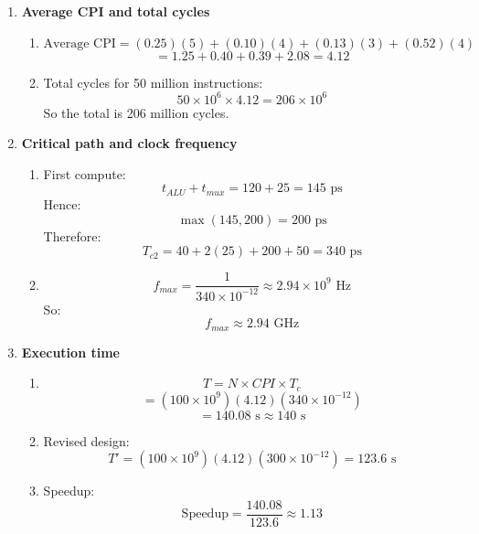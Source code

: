 \documentclass[11pt]{article}
\begin{document}
\begin{enumerate}[label=\textbf{B\arabic*.}]
  \item \textbf{Average CPI and total cycles}
  \begin{enumerate}[label=(\alph*)]
    \item
    \[
      \text{Average CPI} = (0.25)(5) + (0.10)(4) + (0.13)(3) + (0.52)(4)
    \]
    \[
      = 1.25 + 0.40 + 0.39 + 2.08 = 4.12
    \]
    \item Total cycles for 50 million instructions:
    \[
      50 \times 10^6 \times 4.12 = 206 \times 10^6
    \]
    So the total is 206 million cycles.
  \end{enumerate}

  \item \textbf{Critical path and clock frequency}
  \begin{enumerate}[label=(\alph*)]
    \item First compute:
    \[
      t_{ALU} + t_{mux} = 120 + 25 = 145 \text{ ps}
    \]
    Hence:
    \[
      \max(145, 200) = 200 \text{ ps}
    \]
    Therefore:
    \[
      T_{c2} = 40 + 2(25) + 200 + 50 = 340 \text{ ps}
    \]
    \item
    \[
      f_{max} = \frac{1}{340 \times 10^{-12}} \approx 2.94 \times 10^9 \text{ Hz}
    \]
    So:
    \[
      f_{max} \approx 2.94 \text{ GHz}
    \]
  \end{enumerate}

  \item \textbf{Execution time}
  \begin{enumerate}[label=(\alph*)]
    \item
    \[
      T = N \times CPI \times T_c
    \]
    \[
      = (100 \times 10^9)(4.12)(340 \times 10^{-12})
    \]
    \[
      = 140.08 \text{ s} \approx 140 \text{ s}
    \]
    \item Revised design:
    \[
      T' = (100 \times 10^9)(4.12)(300 \times 10^{-12}) = 123.6 \text{ s}
    \]
    \item Speedup:
    \[
      \text{Speedup} = \frac{140.08}{123.6} \approx 1.13
    \]
  \end{enumerate}
\end{enumerate}
\end{document}
